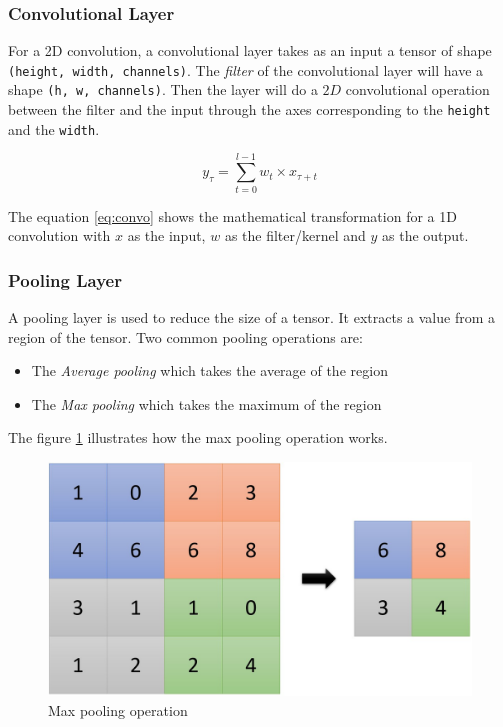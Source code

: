 \documentclass[12pt]{report}
\begin{document}
\subsubsection{Convolutional Layer}

For a 2D convolution, a convolutional layer takes as an input a tensor of shape \texttt{(height, width, channels)}.
The \textit{filter} of the convolutional layer will have a shape \texttt{(h, w, channels)}.
Then the layer will do a $2D$ convolutional operation between the filter and the input through the axes corresponding to the \texttt{height} and the \texttt{width}.

\begin{equation}
    y_{\tau} = \sum_{t=0}^{l-1} w_{t} \times x_{\tau + t}
    \label{eq:convo}
\end{equation}

The equation \ref{eq:convo} shows the mathematical transformation for a 1D convolution with $x$ as the input, $w$ as the filter/kernel and $y$ as the output.

\subsubsection{Pooling Layer}

A pooling layer is used to reduce the size of a tensor. It extracts a value from a region of the tensor. Two common pooling operations are:
\begin{itemize}
    \item The \textit{Average pooling} which takes the average of the region
    \item The \textit{Max pooling} which takes the maximum of the region
\end{itemize}
The figure \ref{fig:max_pooling} illustrates how the max pooling operation works.

\begin{figure}[H]
    \centering
    \includegraphics[width=0.75 \textwidth]{images/nn/layers/max_pooling.jpg}
    \caption{Max pooling operation}
    \label{fig:max_pooling}
\end{figure}
\end{document}
